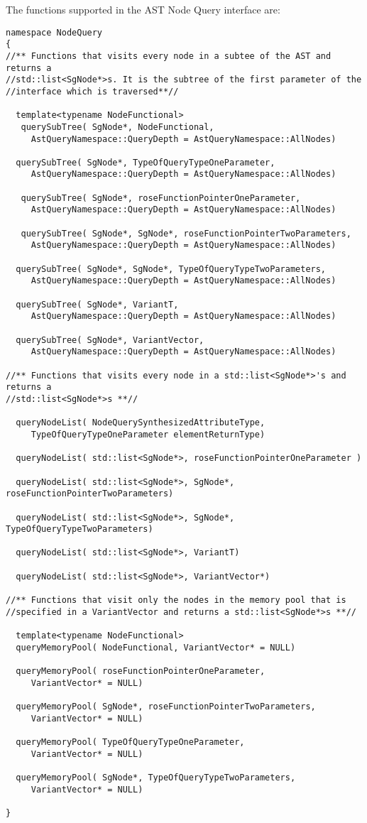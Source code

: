    The functions supported in the AST Node Query interface are:
{\mySmallFontSize
\begin{verbatim}
namespace NodeQuery
{
//** Functions that visits every node in a subtee of the AST and returns a
//std::list<SgNode*>s. It is the subtree of the first parameter of the
//interface which is traversed**//

  template<typename NodeFunctional>
   querySubTree( SgNode*, NodeFunctional, 
     AstQueryNamespace::QueryDepth = AstQueryNamespace::AllNodes)

  querySubTree( SgNode*, TypeOfQueryTypeOneParameter,
     AstQueryNamespace::QueryDepth = AstQueryNamespace::AllNodes)

   querySubTree( SgNode*, roseFunctionPointerOneParameter,
     AstQueryNamespace::QueryDepth = AstQueryNamespace::AllNodes)

   querySubTree( SgNode*, SgNode*, roseFunctionPointerTwoParameters,
     AstQueryNamespace::QueryDepth = AstQueryNamespace::AllNodes)
  
  querySubTree( SgNode*, SgNode*, TypeOfQueryTypeTwoParameters,
     AstQueryNamespace::QueryDepth = AstQueryNamespace::AllNodes)

  querySubTree( SgNode*, VariantT,
     AstQueryNamespace::QueryDepth = AstQueryNamespace::AllNodes)
     
  querySubTree( SgNode*, VariantVector,
     AstQueryNamespace::QueryDepth = AstQueryNamespace::AllNodes)

//** Functions that visits every node in a std::list<SgNode*>'s and returns a 
//std::list<SgNode*>s **//
  
  queryNodeList( NodeQuerySynthesizedAttributeType,
     TypeOfQueryTypeOneParameter elementReturnType)

  queryNodeList( std::list<SgNode*>, roseFunctionPointerOneParameter )

  queryNodeList( std::list<SgNode*>, SgNode*, roseFunctionPointerTwoParameters)

  queryNodeList( std::list<SgNode*>, SgNode*, TypeOfQueryTypeTwoParameters)
 
  queryNodeList( std::list<SgNode*>, VariantT)

  queryNodeList( std::list<SgNode*>, VariantVector*)

//** Functions that visit only the nodes in the memory pool that is
//specified in a VariantVector and returns a std::list<SgNode*>s **// 

  template<typename NodeFunctional>
  queryMemoryPool( NodeFunctional, VariantVector* = NULL)

  queryMemoryPool( roseFunctionPointerOneParameter, 
     VariantVector* = NULL)

  queryMemoryPool( SgNode*, roseFunctionPointerTwoParameters, 
     VariantVector* = NULL)

  queryMemoryPool( TypeOfQueryTypeOneParameter,
     VariantVector* = NULL)

  queryMemoryPool( SgNode*, TypeOfQueryTypeTwoParameters,
     VariantVector* = NULL)

}
\end{verbatim}
}


